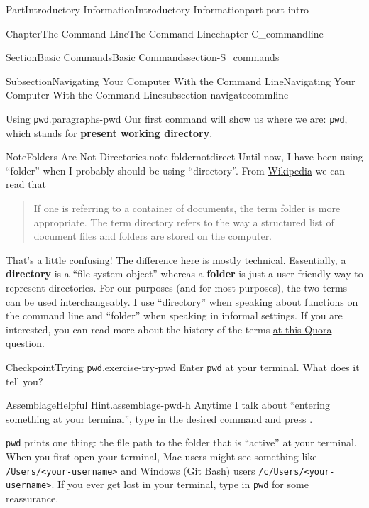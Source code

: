 \documentclass[twoside,10pt,]{book}
\newcommand{\mono}[1]{\texttt{#1}}
\newcommand{\terminology}[1]{\textbf{#1}}
\newcommand{\kbd}[1]{\keys{{#1}}}
\begin{document}
\begin{partptx}{Part}{Introductory Information}{}{Introductory Information}{}{}{part-part-intro}
\begin{chapterptx}{Chapter}{The Command Line}{}{The Command Line}{}{}{chapter-C_commandline}
\begin{sectionptx}{Section}{Basic Commands}{}{Basic Commands}{}{}{section-S_commands}
\begin{subsectionptx}{Subsection}{Navigating Your Computer With the Command Line}{}{Navigating Your Computer With the Command Line}{}{}{subsection-navigatecommline}
\begin{paragraphs}{Using \mono{pwd}.}{paragraphs-pwd}%
\index{command line!\mono{pwd}}%
%
\index{\mono{pwd}}%
Our first command will show us where we are: \mono{pwd}, which stands for \terminology{present working directory}.%
\begin{note}{Note}{Folders Are Not Directories.}{note-foldernotdirect}%
%
%
Until now, I have been using ``folder'' when I probably should be using ``directory''. From \href{https://en.wikipedia.org/wiki/Directory_\%28computing\%29\#Folder_metaphor}{Wikipedia}\footnotemark{} we can read that%
\begin{quote}%
If one is referring to a container of documents, the term folder is more appropriate. The term directory refers to the way a structured list of document files and folders are stored on the computer.%
\end{quote}
That's a little confusing! The difference here is mostly technical. Essentially, a \terminology{directory} is a ``file system object'' whereas a \terminology{folder} is just a user-friendly way to represent directories. For our purposes (and for most purposes), the two terms can be used interchangeably. I use ``directory'' when speaking about functions on the command line and ``folder'' when speaking in informal settings. If you are interested, you can read more about the history of the terms \href{https://www.quora.com/What-is-the-difference-between-a-folder-and-a-directory}{at this Quora question}\footnotemark{}.%
\end{note}
%
%
\begin{inlineexercise}{Checkpoint}{Trying \mono{pwd}.}{exercise-try-pwd}%
Enter \mono{pwd} at your terminal. What does it tell you?%
\end{inlineexercise}%
\begin{assemblage}{Assemblage}{Helpful Hint.}{assemblage-pwd-h}%
Anytime I talk about ``entering something at your terminal'', type in the desired command and press \kbd{Enter}.%
\end{assemblage}
\mono{pwd} prints one thing: the file path to the folder that is ``active'' at your terminal. When you first open your terminal, Mac users might see something like \mono{/Users/<your-username>} and Windows (Git Bash) users \mono{/c/Users/<your-username>}. If you ever get lost in your terminal, type in \mono{pwd} for some reassurance.%

\end{paragraphs}
\end{subsectionptx}
\end{sectionptx}
\end{chapterptx}
\end{partptx}
\end{document}
